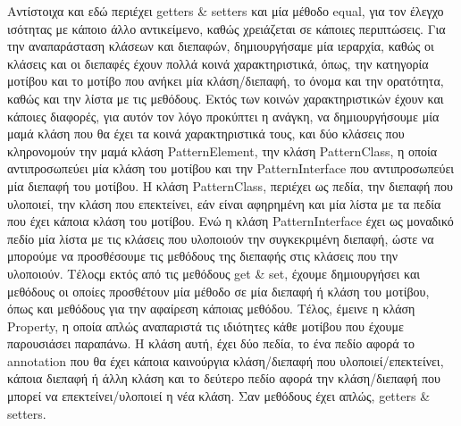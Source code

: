 Αντίστοιχα και εδώ περιέχει getters \& setters και μία μέθοδο equal, για τον έλεγχο ισότητας με κάποιο άλλο αντικείμενο, 
καθώς χρειάζεται σε κάποιες περιπτώσεις.
\newline
Για την αναπαράσταση κλάσεων και διεπαφών, δημιουργήσαμε μία ιεραρχία, καθώς οι κλάσεις και οι διεπαφές 
έχουν πολλά κοινά χαρακτηριστικά, όπως, την κατηγορία μοτίβου και το μοτίβο που ανήκει μία κλάση/διεπαφή, το όνομα και την ορατότητα, 
καθώς και την λίστα με τις μεθόδους. Εκτός των κοινών χαρακτηριστικών έχουν και κάποιες διαφορές, για αυτόν τον λόγο προκύπτει η ανάγκη, 
να δημιουργήσουμε μία μαμά κλάση που θα έχει τα κοινά χαρακτηριστικά τους, και δύο κλάσεις που κληρονομούν την μαμά κλάση PatternElement, 
την κλάση PatternClass, η οποία αντιπροσωπεύει μία κλάση του μοτίβου και την PatternInterface που αντιπροσωπεύει μία διεπαφή του μοτίβου. 
Η κλάση PatternClass, περιέχει ως πεδία, την διεπαφή που υλοποιεί, την κλάση που επεκτείνει, εάν είναι αφηρημένη και 
μία λίστα με τα πεδία που έχει κάποια κλάση του μοτίβου. Ενώ η κλάση PatternInterface έχει ως μοναδικό 
πεδίο μία λίστα με τις κλάσεις που υλοποιούν την συγκεκριμένη διεπαφή, ώστε να μπορούμε να προσθέσουμε τις μεθόδους της 
διεπαφής στις κλάσεις που την υλοποιούν. Τέλοςμ εκτός από τις μεθόδους get \& set, έχουμε δημιουργήσει και μεθόδους 
οι οποίες προσθέτουν μία μέθοδο σε μία διεπαφή ή κλάση του μοτίβου, όπως και μεθόδους για την αφαίρεση κάποιας μεθόδου.
\newline
Τέλος, έμεινε η κλάση Property, η οποία απλώς αναπαριστά τις ιδιότητες κάθε μοτίβου που έχουμε παρουσιάσει παραπάνω. Η κλάση αυτή, 
έχει δύο πεδία, το ένα πεδίο αφορά το annotation που θα έχει κάποια καινούργια κλάση/διεπαφή που υλοποιεί/επεκτείνει, 
κάποια διεπαφή ή άλλη κλάση και το δεύτερο πεδίο αφορά την κλάση/διεπαφή που μπορεί να επεκτείνει/υλοποιεί η  νέα κλάση. Σαν μεθόδους έχει απλώς, 
getters \& setters.
